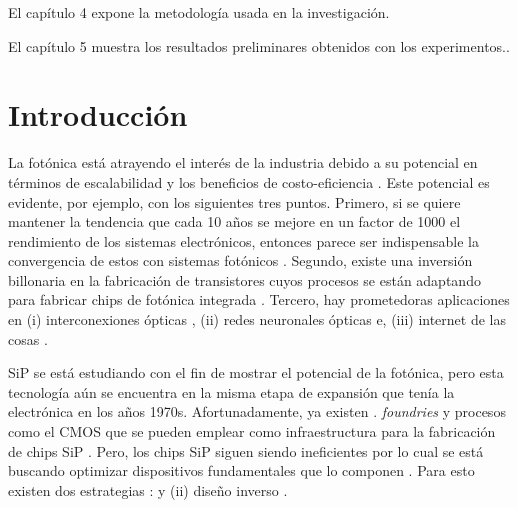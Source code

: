 El capítulo 4 expone la metodología usada en la investigación. 

El capítulo 5 muestra los resultados preliminares obtenidos con los experimentos..

\section{Introducción}

La fotónica está atrayendo el interés de la industria debido a su potencial en términos de escalabilidad y los beneficios de costo-eficiencia . 
Este potencial es evidente, por ejemplo, con los siguientes tres puntos. 
Primero, si se quiere mantener la tendencia que cada 10 años se mejore en un factor de 1000 el rendimiento de los sistemas electrónicos, entonces parece ser indispensable la convergencia de estos con sistemas fotónicos  \citep{Glick2018}. 
Segundo,  existe una inversión billonaria en la fabricación de transistores cuyos procesos se están adaptando para fabricar chips de fotónica integrada \citep{LukasChrostowski2010}.
Tercero, hay prometedoras aplicaciones en  (i) interconexiones ópticas \citep{Shen2019}, (ii) redes neuronales ópticas \citep{Shen2017}e, (iii) internet de las cosas \citep{Glick2018}.
 

SiP   se está estudiando con el fin de mostrar el potencial de la fotónica,  pero esta tecnología aún se encuentra en la misma etapa de expansión que tenía la electrónica en los años 1970s.
Afortunadamente, ya existen .  \emph{foundries} y procesos como el CMOS que se pueden emplear como infraestructura para la fabricación de chips SiP \citep{LukasChrostowski2010}.
Pero,  los chips SiP siguen siendo ineficientes  por lo cual se está buscando optimizar dispositivos fundamentales que lo componen \citep{Vuckovic2019}.
Para esto existen dos estrategias :  y (ii) diseño inverso .

